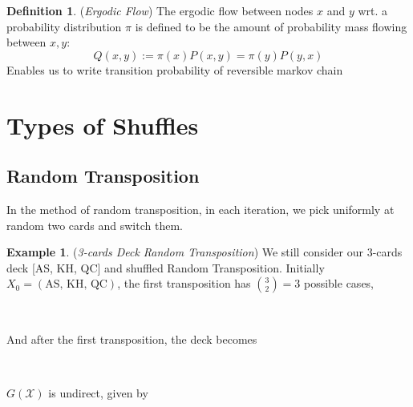 \documentclass[a4paper, 11pt]{article}
\theoremstyle{definition}
\newtheorem{definition}{Definition}
\newtheorem{example}{Example}
\begin{document}
\begin{definition} (\textit{Ergodic Flow}) The ergodic flow between nodes $x$ and $y$ wrt. a probability distribution $\pi$ is defined
to be the amount of probability mass flowing between $x,y$:
$$Q(x,y):=\pi(x)P(x,y)=\pi(y)P(y,x)$$
Enables us to write transition probability of reversible markov chain 
\end{definition}



\section{Types of Shuffles}
\subsection{Random Transposition}
In the method of random transposition, in each iteration, we pick uniformly at random two cards and switch them. 
\begin{example} (\textit{3-cards Deck Random Transposition}) We still consider our 3-cards deck [AS, KH, QC] and shuffled Random Transposition. Initially $X_0=(\text{AS, KH, QC})$, the first transposition has $\binom{3}{2}=3$ possible cases,
\begin{center}
	~~~~~~~~
\end{center}
And after the first transposition, the deck becomes
\begin{center}
	~~~~~~~~
\end{center}
$G(\mathcal{X})$ is undirect, given by
\begin{center}
\end{center}
\end{example}
\end{document}
